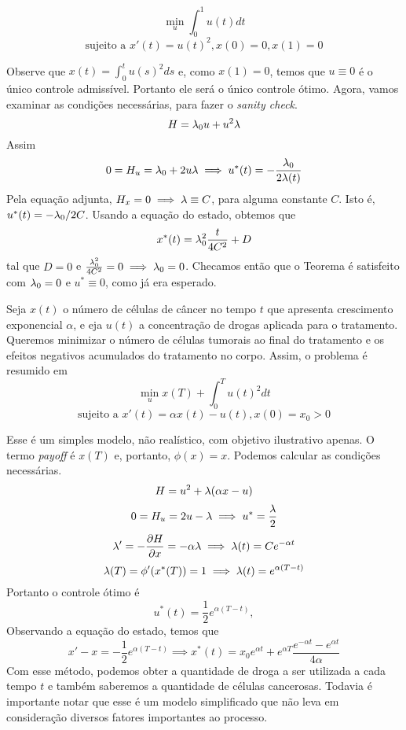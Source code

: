\begin{example}
    \begin{equation*}
        \min_u \int_0^1 u(t) dt
    \end{equation*}
    \begin{equation*}
        \text{sujeito a   }x'(t) = u(t)^2, x(0) = 0, x(1) = 0
    \end{equation*}
\end{example}

Observe que $x(t) = \int_0^t u(s)^2 ds$ e, como $x(1) = 0$, temos que $u
\equiv 0$ é o único controle admissível. Portanto ele será o único controle
ótimo. Agora, vamos examinar as condições necessárias, para fazer o
\textit{sanity check}. 
$$
H = \lambda_0 u + u^2 \lambda 
$$
Assim 
$$
0 = H_u = \lambda_0 + 2u \lambda \implies u^*(t) = -\frac{\lambda_0}{2\lambda(t)}
$$
Pela equação adjunta, $H_x = 0 \implies \lambda \equiv C$, para alguma constante
$C$. Isto é, $u^*(t) = -\lambda_0/2C$. Usando a equação do estado, obtemos que 
$$
x^*(t) = \lambda_0^2 \frac{t}{4C^2} + D
$$
tal que $D = 0$ e $\frac{\lambda_0^2}{4C^2} = 0 \implies \lambda_0 = 0$. Checamos
então que o Teorema é satisfeito com $\lambda_0 = 0$ e $u^* \equiv 0$, como já era
esperado. 

\begin{example}
    Seja $x(t)$ o número de células de câncer no tempo $t$ que apresenta
    crescimento exponencial $\alpha$, e eja $u(t)$ a concentração de drogas
    aplicada para o tratamento. Queremos minimizar o número de células
    tumorais ao final do tratamento e os efeitos negativos acumulados do tratamento no corpo. Assim, o problema é resumido em 
    $$
    \min_u x(T) + \int_0^T u(t)^2 dt
    $$
    $$
    \text{sujeito a  }x'(t) = \alpha x(t) - u(t), x(0) = x_0 > 0
    $$
\end{example}

Esse é um simples modelo, não realístico, com objetivo ilustrativo apenas. O
termo \textit{payoff} é $x(T)$ e, portanto, $\phi(x) = x$. Podemos calcular as
condições necessárias. 
$$
H = u^2 + \lambda(\alpha x - u)
$$
$$
0 = H_u = 2u - \lambda \implies u^* = \frac{\lambda}{2}
$$
$$
\lambda ' = -\dfrac{\partial H}{\partial x} = - \alpha \lambda \implies \lambda(t) = Ce^{-\alpha t}
$$
$$
\lambda(T) = \phi '(x^*(T)) = 1 \implies \lambda(t) = e^{\alpha(T - t)}
$$
Portanto o controle ótimo é $$u^{*}(t) = \frac{1}{2}e^{\alpha(T - t)},$$
Observando a equação do estado, temos que 
$$
x' - x = - \frac{1}{2}e^{\alpha(T - t)} \implies x^*(t) = x_0 e^{\alpha t} + e^{\alpha T}\frac{e^{-\alpha t} - e^{\alpha t}}{4\alpha}
$$
Com esse método, podemos obter a quantidade de droga a ser utilizada a cada
tempo $t$ e também saberemos a quantidade de células cancerosas. Todavia é
importante notar que esse é um modelo simplificado que não leva em
consideração diversos fatores importantes ao processo. 